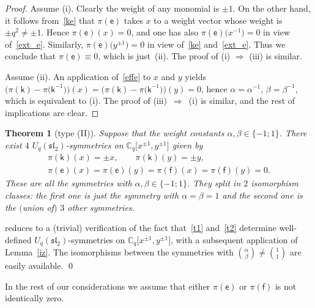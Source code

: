 \documentclass[pdftex]{sigma}
\numberwithin{equation}{section}
\newtheorem{Theorem}{Theorem}[section]
\begin{document}
\begin{proof} Assume (i). Clearly the weight of any monomial is $\pm 1$. On the other hand, it follows from~\eqref{ke} that $\pi(\mathsf{e})$ takes $x$ to a weight vector whose weight is $\pm q^2\ne\pm 1$. Hence $\pi(\mathsf{e})(x)=0$, and one has also $\pi(\mathsf{e})\big(x^{-1}\big)=0$ in view of~\eqref{ext_e}. Similarly, $\pi(\mathsf{e})\big(y^{\pm 1}\big)=0$ in view of~\eqref{ke} and~\eqref{ext_e}. Thus we conclude that $\pi(\mathsf{e})\equiv 0$, which is just~(ii). The proof of (i) $\Rightarrow$ (iii) is similar.

Assume (ii). An application of~\eqref{effe} to $x$ and $y$ yields $\big(\pi(\mathsf{k})-\pi\big(\mathsf{k}^{-1}\big)\big)(x)=
\big(\pi(\mathsf{k})-\pi\big(\mathsf{k}^{-1}\big)\big)(y)=0$, hence $\alpha=\alpha^{-1}$, $\beta=\beta^{-1}$, which is equivalent to (i). The proof of (iii)~$\Rightarrow$~(i) is similar, and the rest of implications are clear. \end{proof}

\begin{Theorem}[type (II)]\label{T01}
Suppose that the weight constants $\alpha,\beta\in\{-1;1\}$. There exist $4$ $U_q(\mathfrak{sl}_2)$-symmetries on $\mathbb{C}_q\big[x^{\pm 1},y^{\pm 1}\big]$ given by
\begin{gather}
\pi(\mathsf{k})(x) =\pm x,\qquad\pi(\mathsf{k})(y)=\pm y, \label{t1}\\
\pi(\mathsf{e})(x) =\pi(\mathsf{e})(y)=\pi(\mathsf{f})(x)=\pi(\mathsf{f})(y)=0. \label{t2}
\end{gather}
These are all the symmetries with $\alpha,\beta\in\{-1;1\}$. They split in $2$ isomorphism classes: the first one is just the symmetry with $\alpha=\beta=1$ and the second one is the $($union of$)$ $3$ other symmetries.
\end{Theorem}

 reduces to a (trivial) verification of the fact that~\eqref{t1} and~\eqref{t2} determine well-defined $U_q(\mathfrak{sl}_2)$-symmetries on $\mathbb{C}_q\big[x^{\pm 1},y^{\pm 1}\big]$, with a subsequent application of Lemma~\ref{iz}. The isomorphisms between the symmetries with $\binom{\alpha}{\beta}\ne\binom{1}{1}$ are easily available.
\hfill \qed

\medskip

In the rest of our considerations we assume that either $\pi(\mathsf{e})$ or $\pi(\mathsf{f})$ is not identically zero.
\end{document}
